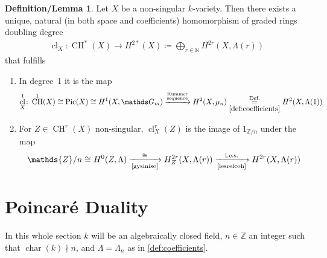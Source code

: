 \documentclass[english]{scrartcl}
\theoremstyle{definition}
\newtheorem{DefLem}[Def]{Definition/Lemma}
\theoremstyle{remark}
\newcommand*{\N}{\mathds{N}}
\newcommand*{\Z}{\mathds{Z}}
\newcommand*{\Zmod}[1]{\Z/#1} %
\DeclareMathOperator{\Char}{char} %
\DeclareMathOperator{\CH}{CH} %
\DeclareMathOperator{\Pic}{Pic} %
\DeclareMathOperator{\CL}{cl} %
\begin{document}
\begin{DefLem}\label{cycleclassmap}
  Let $X$ be a non-singular $k$-variety.
  Then there exists a unique, natural (in both space and coefficients)
  homomorphism of graded rings doubling degree
  \begin{gather*}
    \CL_X\colon \CH^*(X)\rightarrow H^{2*}(X)\coloneqq
    \bigoplus_{r\in\N} H^{2r}(X,\Lambda(r))
  \end{gather*}
  that fulfills
  \begin{enumerate}
  \item In degree~1 it is the map
    \begin{gather*}
      \CL_X^1\colon
      \CH^1(X)\cong \Pic(X)\cong H^1(X,\mathds G_m)
      \xrightarrow{\footnotesize\substack{\text{Kummer}\\\text{sequence}}}
      H^2(X,\mu_n)
      \overset{\text{Def.}}{\underset{\ref{def:coefficients}}{=}}
      H^2(X,\Lambda(1))
    \end{gather*}
  \item For $Z\in\CH^r(X)$ non-singular, $\CL_X^r(Z)$ is the image of
    $1_{\Zmod{n}}$ under the map
    \begin{gather*}
      \Zmod{n} \cong H^0(Z,\Lambda)
      \xrightarrow[\text{\ref{gysiniso}}]{\cong}
      H_Z^{2r}(X,\Lambda(r))
      \xrightarrow[\text{\ref{lesrelcoh}}]{\text{l.e.s.}}
      H^{2r}(X,\Lambda(r))
    \end{gather*}
  \end{enumerate}
\end{DefLem}


\section{Poincaré Duality}
In this whole section $k$ will be an algebraically closed field,
$n\in\Z$ an integer such that $\Char(k)\nmid n$,
and $\Lambda=\Lambda_n$ as in \ref{def:coefficients}.
\end{document}
